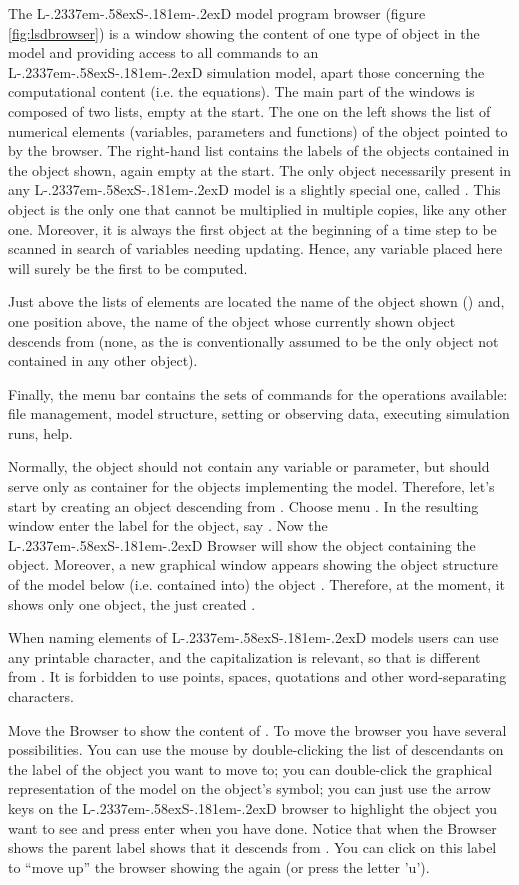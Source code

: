 \documentclass [11pt,a4paper] {book}
\def\LsD{{L\kern-.2337em\lower-.58ex\hbox{S}\kern-.181em\lower-.2ex\hbox{D}}\xspace}
\begin{document}
The \LsD model program browser (figure \ref{fig:lsdbrowser}) is a window showing the content of one type of object in the model and providing access to all commands to an \LsD simulation model, apart those concerning the computational content (i.e. the equations). The main part of the windows is composed of two lists, empty at the start. The one on the left shows the list of numerical elements (variables, parameters and functions) of the object pointed to by the browser. The right-hand list contains the labels of the objects contained in the object shown, again empty at the start. The only object necessarily present in any \LsD model is a slightly special one, called . This object is the only one that cannot be multiplied in multiple copies, like any other one. Moreover, it is always the first object at the beginning of a time step to be scanned in search of variables needing updating. Hence, any variable placed here will surely be the first to be computed.

Just above the lists of elements are located the name of the object shown () and, one position above, the name of the object whose currently shown object descends from (none, as the  is conventionally assumed to be the only object not contained in any other object).

Finally, the menu bar contains the sets of commands for the operations available: file management, model structure, setting or observing data, executing simulation runs, help.


Normally, the  object should not contain any variable or parameter, but
should serve only as container for the objects implementing the model. Therefore, let's
start by creating an object descending from . Choose menu . In the resulting window enter the label for the object, say
. Now the \LsD Browser will show the  object containing the
 object. Moreover, a new graphical window appears showing the object structure
of the model below (i.e. contained into) the object . Therefore, at the moment, it shows
only one object, the just created .

When naming elements of \LsD models users can use any printable character, and the capitalization is relevant, so that  is different from . It is forbidden to use points, spaces, quotations and other word-separating characters.

Move the Browser to show the content of . To move the browser you have several
possibilities. You can use the mouse by double-clicking the list of descendants on the
label of the object you want to move to; you can double-click the graphical
representation of the model on the object's symbol; you can just use the arrow
keys on the \LsD browser to highlight the object you want to see and press enter when you have done. Notice
that when the Browser shows  the parent label shows that it descends from
. You can click on this label to ``move up'' the browser showing the
 again (or press the letter 'u').
\end{document}
